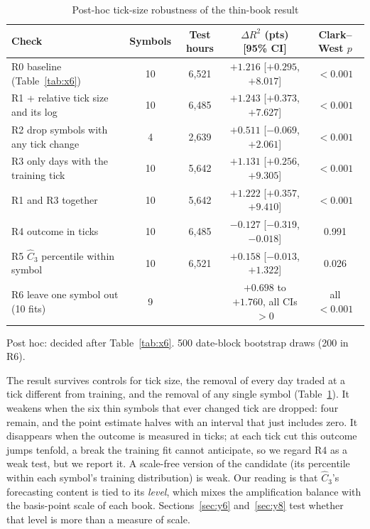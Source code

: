 \documentclass[12pt]{article}
\theoremstyle{definition}
\theoremstyle{remark}
\begin{document}
\begin{table}[t]\centering\small
\begin{threeparttable}
\caption{Post-hoc tick-size robustness of the thin-book result}\label{tab:x6r}
\setlength{\tabcolsep}{3pt}
\begin{tabular}{p{}cccc}
\toprule
Check & Symbols & Test hours & $\Delta R^2$ (pts) [95\% CI] & Clark--West $p$\\
\midrule
R0 baseline (Table~\ref{tab:x6}) & 10 & 6{,}521 & $+1.216$ [$+0.295$, $+8.017$] & $<0.001$\\
R1 + relative tick size and its log & 10 & 6{,}485 & $+1.243$ [$+0.373$, $+7.627$] & $<0.001$\\
R2 drop symbols with any tick change & 4 & 2{,}639 & $+0.511$ [$-0.069$, $+2.061$] & $<0.001$\\
R3 only days with the training tick & 10 & 5{,}642 & $+1.131$ [$+0.256$, $+9.305$] & $<0.001$\\
R1 and R3 together & 10 & 5{,}642 & $+1.222$ [$+0.357$, $+9.410$] & $<0.001$\\
R4 outcome in ticks & 10 & 6{,}485 & $-0.127$ [$-0.319$, $-0.018$] & 0.991\\
R5 $\hat C_3$ percentile within symbol & 10 & 6{,}521 & $+0.158$ [$-0.013$, $+1.322$] & 0.026\\
R6 leave one symbol out (10 fits) & 9 & & $+0.698$ to $+1.760$, all CIs $>0$ & all $<0.001$\\
\bottomrule
\end{tabular}
\begin{tablenotes}\footnotesize\item Post hoc: decided after Table~\ref{tab:x6}. 500 date-block bootstrap draws (200 in R6). \end{tablenotes}
\end{threeparttable}
\end{table}

The result survives controls for tick size, the removal of every day traded at a tick different from training, and the removal of any single symbol (Table~\ref{tab:x6r}). It weakens when the six thin symbols that ever changed tick are dropped: four remain, and the point estimate halves with an interval that just includes zero. It disappears when the outcome is measured in ticks; at each tick cut this outcome jumps tenfold, a break the training fit cannot anticipate, so we regard R4 as a weak test, but we report it. A scale-free version of the candidate (its percentile within each symbol's training distribution) is weak. Our reading is that $\hat C_3$'s forecasting content is tied to its \emph{level}, which mixes the amplification balance with the basis-point scale of each book. Sections~\ref{sec:y6} and~\ref{sec:y8} test whether that level is more than a measure of scale.
\end{document}
